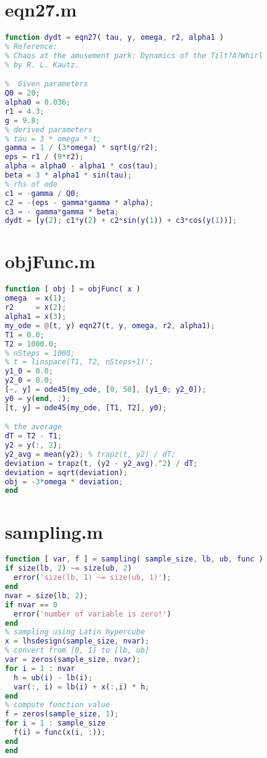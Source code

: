 \documentclass[a4paper]{article}
\begin{document}
\small
\begin{appendices} 
\section{eqn27.m}\label{app:eqn27}
\begin{lstlisting}[language=Matlab]
function dydt = eqn27( tau, y, omega, r2, alpha1 )
% Reference: 
% Chaos at the amusement park: Dynamics of the Tilt?A?Whirl
% by R. L. Kautz.

%  Given parameters
Q0 = 20;
alpha0 = 0.036;
r1 = 4.3;
g = 9.8;
% derived parameters
% tau = 3 * omega * t;
gamma = 1 / (3*omega) * sqrt(g/r2);
eps = r1 / (9*r2);
alpha = alpha0 - alpha1 * cos(tau);
beta = 3 * alpha1 * sin(tau);
% rhs of ode
c1 = -gamma / Q0;
c2 = -(eps - gamma*gamma * alpha);
c3 = - gamma*gamma * beta;
dydt = [y(2); c1*y(2) + c2*sin(y(1)) + c3*cos(y(1))];


\end{lstlisting}

\section{objFunc.m}\label{app:calcobj}
\begin{lstlisting}[language=Matlab]
function [ obj ] = objFunc( x )
omega  = x(1);
r2     = x(2);
alpha1 = x(3);
my_ode = @(t, y) eqn27(t, y, omega, r2, alpha1);
T1 = 0.0;
T2 = 1000.0;
% nSteps = 1000;
% t = linspace(T1, T2, nSteps+1)';
y1_0 = 0.0;
y2_0 = 0.0;
[~, y] = ode45(my_ode, [0, 50], [y1_0; y2_0]);
y0 = y(end, :);
[t, y] = ode45(my_ode, [T1, T2], y0);

% the average
dT = T2 - T1;
y2 = y(:, 2);
y2_avg = mean(y2); % trapz(t, y2) / dT;
deviation = trapz(t, (y2 - y2_avg).^2) / dT;
deviation = sqrt(deviation);
obj = -3*omega * deviation;
end
\end{lstlisting}

\section{sampling.m}\label{app:sampling}
\begin{lstlisting}[language=Matlab]
function [ var, f ] = sampling( sample_size, lb, ub, func )
if size(lb, 2) ~= size(ub, 2)
  error('size(lb, 1) ~= size(ub, 1)');
end
nvar = size(lb, 2);
if nvar == 0
  error('number of variable is zero!')
end
% sampling using Latin hypercube
x = lhsdesign(sample_size, nvar);
% convert from [0, 1] to [lb, ub]
var = zeros(sample_size, nvar);
for i = 1 : nvar
  h = ub(i) - lb(i);
  var(:, i) = lb(i) + x(:,i) * h; 
end
% compute function value
f = zeros(sample_size, 1);
for i = 1 : sample_size
  f(i) = func(x(i, :));
end
end
\end{lstlisting}


\end{appendices}
\end{document}
